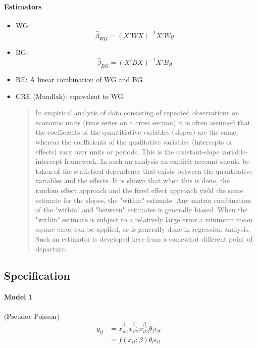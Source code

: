 \paragraph{Estimators}
\begin{itemize}
    \item WG: \begin{equation*}
              \hat{\beta}_{WG}=(X'WX)^{-1}X'W y
          \end{equation*}
    \item BG: \begin{equation*}
              \hat{\beta}_{BG}=(X'B X)^{-1}X'By\end{equation*}
    \item RE: A linear combination of WG and BG
    \item CRE (Mundlak): equivalent to WG
          \begin{quote}
              In empirical analysis of data consisting of repeated observations on economic units (time series on a cross section) it is often assumed that the coefficients of the quantitiative variables (slopes) are the same, whereas the coefficients of the qualitative variables (intercepts or effects) vary over units or periods. This is the constant-slope variable- intercept framework. In such an analysis an explicit account should be taken of the statistical dependence that exists between the quantitative variables and the effects. It is shown that when this is done, the random effect approach and the fixed effect approach yield the same estimate for the slopes, the "within" estimate. Any matrix combination of the "within" and "between" estimates is generally biased. When the "within" estimate is subject to a relatively large error a minimum mean square error can be applied, as is generally done in regression analysis. Such an estimator is developed here from a somewhat different point of departure.
          \end{quote}
\end{itemize}
\subsection{Specification}\hypertarget{home}{}
\paragraph{Model 1} (Pseudoc Poisson)
\begin{equation*}
    \begin{split}
        y_{it}&=x_{it1}^{\beta_1}x_{it2}^{\beta_2}x_{it3}^{\beta_3}\theta_i\epsilon_{it}\\
        &= f(x_{it};\beta)\theta_i\epsilon_{it}\\
    \end{split}
\end{equation*}

